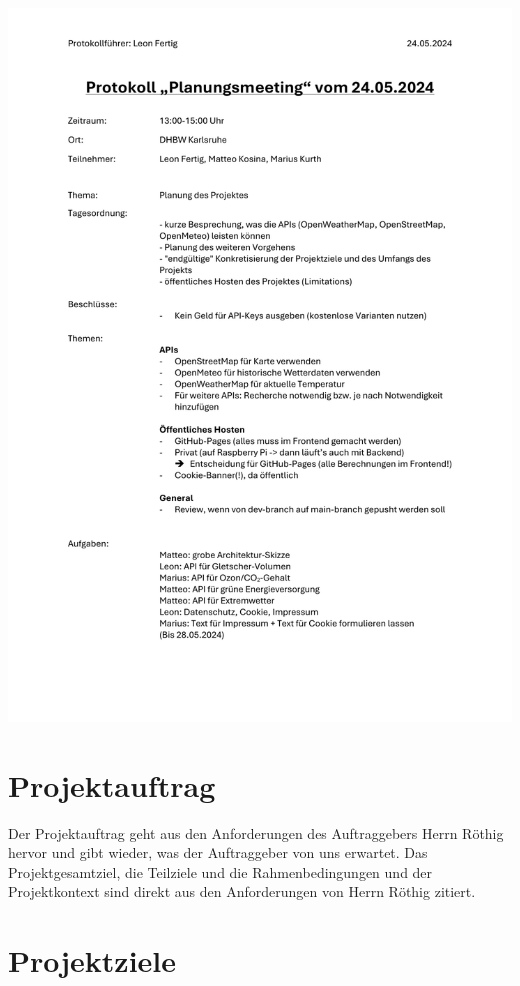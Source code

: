 \documentclass[12pt]{article}
\begin{document}
\includegraphics[width=\textwidth]{Planungsdokumente/graphics/Protokoll2.pdf}

\section{Projektauftrag}
Der Projektauftrag geht aus den Anforderungen des Auftraggebers Herrn Röthig hervor und gibt wieder, was der Auftraggeber von uns erwartet. Das Projektgesamtziel, die Teilziele und die Rahmenbedingungen und der Projektkontext sind direkt aus den Anforderungen von Herrn Röthig zitiert.


\section{Projektziele}
\end{document}
